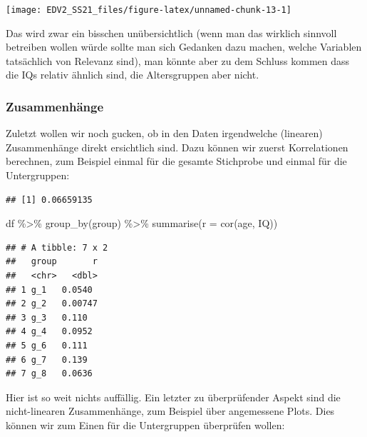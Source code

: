 \documentclass[
]{book}
\newenvironment{Shaded}{\begin{snugshade}}{\end{snugshade}}
\newcommand{\AttributeTok}[1]{\textcolor[rgb]{0.77,0.63,0.00}{#1}}
\newcommand{\FunctionTok}[1]{\textcolor[rgb]{0.00,0.00,0.00}{#1}}
\newcommand{\NormalTok}[1]{#1}
\newcommand{\SpecialCharTok}[1]{\textcolor[rgb]{0.00,0.00,0.00}{#1}}
\begin{document}
\begin{center}\texttt{[image: EDV2\_SS21\_files/figure-latex/unnamed-chunk-13-1]} \end{center}

Das wird zwar ein bisschen unübersichtlich (wenn man das wirklich sinnvoll betreiben wollen würde sollte man sich Gedanken dazu machen, welche Variablen tatsächlich von Relevanz sind), man könnte aber zu dem Schluss kommen dass die IQs relativ ähnlich sind, die Altersgruppen aber nicht.

\hypertarget{zusammenhuxe4nge}{%
\subsubsection{Zusammenhänge}\label{zusammenhuxe4nge}}

Zuletzt wollen wir noch gucken, ob in den Daten irgendwelche (linearen) Zusammenhänge direkt ersichtlich sind. Dazu können wir zuerst Korrelationen berechnen, zum Beispiel einmal für die gesamte Stichprobe und einmal für die Untergruppen:

\begin{Shaded}
\end{Shaded}

\begin{verbatim}
## [1] 0.06659135
\end{verbatim}

\begin{Shaded}
\begin{Highlighting}[]
\NormalTok{df }\SpecialCharTok{\%\textgreater{}\%} 
  \FunctionTok{group\_by}\NormalTok{(group) }\SpecialCharTok{\%\textgreater{}\%} 
  \FunctionTok{summarise}\NormalTok{(}\AttributeTok{r =} \FunctionTok{cor}\NormalTok{(age, IQ))}
\end{Highlighting}
\end{Shaded}

\begin{verbatim}
## # A tibble: 7 x 2
##   group       r
##   <chr>   <dbl>
## 1 g_1   0.0540 
## 2 g_2   0.00747
## 3 g_3   0.110  
## 4 g_4   0.0952 
## 5 g_6   0.111  
## 6 g_7   0.139  
## 7 g_8   0.0636
\end{verbatim}

Hier ist so weit nichts auffällig. Ein letzter zu überprüfender Aspekt sind die nicht-linearen Zusammenhänge, zum Beispiel über angemessene Plots. Dies können wir zum Einen für die Untergruppen überprüfen wollen:
\end{document}
